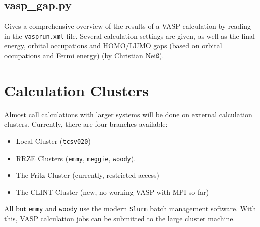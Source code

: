 \documentclass[a4paper,11pt]{article}
\begin{document}
\subsection{vasp\_gap.py}\label{vasp_gap}

Gives a comprehensive overview of the results of a VASP calculation by 
reading in the \texttt{vasprun.xml} file. Several calculation settings 
are given, as well as the final energy, orbital occupations and HOMO/LUMO
gaps (based on orbital occupations and Fermi energy) (by Christian Neiß).


\section{Calculation Clusters}

Almost call calculations with larger systems will be done on external calculation
clusters.
Currently, there are four branches available:

\begin{itemize}
 \item Local Cluster (\texttt{tcsv020})
 \item RRZE Clusters (\texttt{emmy}, \texttt{meggie}, \texttt{woody}).
 \item The Fritz Cluster (currently, restricted access)
 \item The CLINT Cluster (new, no working VASP with MPI so far)
\end{itemize}

All but \texttt{emmy} and \texttt{woody} use the modern \texttt{Slurm}
batch management software.
With this, VASP calculation jobs can be submitted to the large cluster machine.
\end{document}
